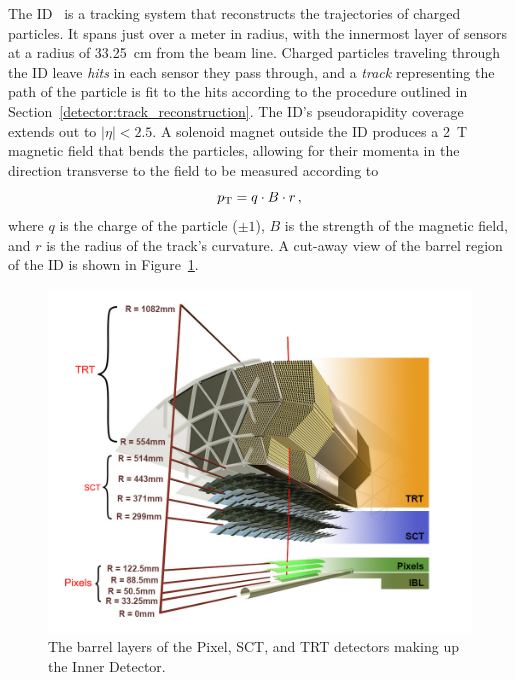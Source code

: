 ﻿The ID~\cite{1997.id-tdr-1, 1997.id-tdr-2} is a tracking system that reconstructs the trajectories of charged particles.
It spans just over a meter in radius, with the innermost layer of sensors at a radius of 33.25~cm from the beam line.
Charged particles traveling through the ID leave \emph{hits} in each sensor they pass through, and a \emph{track} representing the path of the particle is fit to the hits according to the procedure outlined in Section~\ref{detector:track_reconstruction}.
The ID's pseudorapidity coverage extends out to $|\eta| < 2.5$.
A solenoid magnet outside the ID produces a 2~T magnetic field that bends the particles, allowing for their momenta in the direction transverse to the field to be measured according to
\begin{equation}
  \pt = q\cdot B\cdot r\,,
  \label{eq:id_pt}
\end{equation}
where $q$ is the charge of the particle ($\pm 1$), $B$ is the strength of the magnetic field, and $r$ is the radius of the track's curvature.
A cut-away view of the barrel region of the ID is shown in Figure~\ref{fig:detector_ID}.

\begin{figure}
  \centering
  \includegraphics[width=.8\textwidth]{figs/detector/ID}
  \caption{The barrel layers of the Pixel, SCT, and TRT detectors making up the Inner Detector.}
  \label{fig:detector_ID}
\end{figure}

